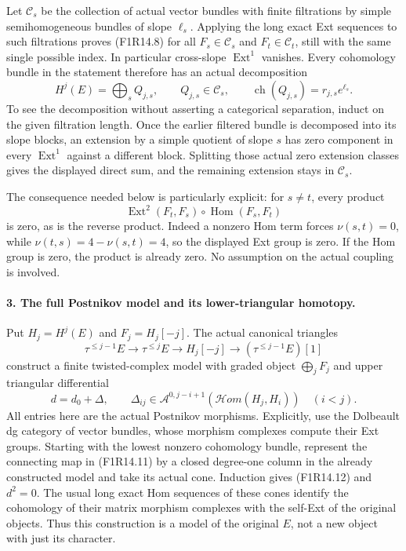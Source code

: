 Let $\mathcal C_s$ be the collection of actual vector bundles
with finite filtrations by simple semihomogeneous bundles
of slope $\ell_s$. Applying the long exact Ext sequences
to such filtrations proves (F1R14.8) for all
$F_s\in\mathcal C_s$ and $F_t\in\mathcal C_t$, still with
the same single possible index. In particular cross-slope
$\operatorname{Ext}^1$ vanishes. Every cohomology bundle
in the statement therefore has an actual decomposition
\[
                  H^j(E)=\bigoplus_s Q_{j,s},
          \qquad Q_{j,s}\in\mathcal C_s,
          \qquad\operatorname{ch}(Q_{j,s})=r_{j,s}e^{\ell_s}.
 \tag{F1R14.10}
\]
To see the decomposition without asserting a categorical
separation, induct on the given filtration length. Once
the earlier filtered bundle is decomposed into its slope
blocks, an extension by a simple quotient of slope $s$
has zero component in every $\operatorname{Ext}^1$
against a different block. Splitting those actual zero
extension classes gives the displayed direct sum, and
the remaining extension stays in $\mathcal C_s$.

The consequence needed below is particularly explicit:
for $s\ne t$, every product
\[
 \operatorname{Ext}^2(F_t,F_s)\circ
                         \operatorname{Hom}(F_s,F_t)
\]
is zero, as is the reverse product. Indeed a nonzero
Hom term forces $\nu(s,t)=0$, while
$\nu(t,s)=4-\nu(s,t)=4$, so the displayed Ext group is
zero. If the Hom group is zero, the product is already
zero. No assumption on the actual coupling is involved.

\paragraph{3. The full Postnikov model and its lower-triangular homotopy.}
Put $H_j=H^j(E)$ and $F_j=H_j[-j]$. The actual canonical
triangles
\[
 \tau^{\le j-1}E\longrightarrow\tau^{\le j}E
                  \longrightarrow H_j[-j]
                  \longrightarrow(\tau^{\le j-1}E)[1]
 \tag{F1R14.11}
\]
construct a finite twisted-complex model with graded
object $\bigoplus_jF_j$ and upper triangular differential
\[
                d=d_0+\Delta,\qquad
       \Delta_{ij}\in
       \mathcal A^{0,j-i+1}(\mathcal Hom(H_j,H_i))
                         \quad(i<j).
 \tag{F1R14.12}
\]
All entries here are the actual Postnikov morphisms.
Explicitly, use the Dolbeault dg category of vector bundles,
whose morphism complexes compute their Ext groups. Starting
with the lowest nonzero cohomology bundle, represent the
connecting map in (F1R14.11) by a closed degree-one column
in the already constructed model and take its actual cone.
Induction gives (F1R14.12) and $d^2=0$. The usual long
exact Hom sequences of these cones identify the cohomology
of their matrix morphism complexes with the self-Ext of
the original objects. Thus this construction is a model
of the original $E$, not a new object with just its character.

